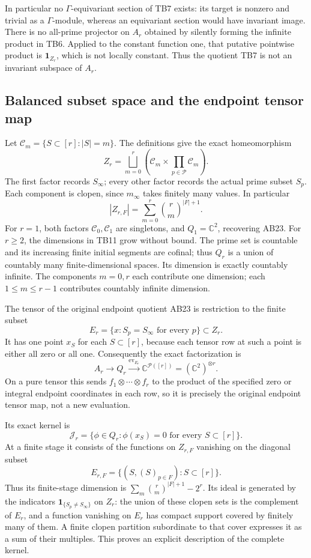 In particular no \(\Gamma\)-equivariant section of TB7 exists:
its target is nonzero and trivial as a \(\Gamma\)-module, whereas
an equivariant section would have invariant image.
There is no all-prime projector on \(A_r\) obtained by silently
forming the infinite product in TB6. Applied to the constant
function one, that putative pointwise product is
\(\mathbf1_{Z_r}\), which is not locally constant.
Thus the quotient TB7 is not an invariant subspace of \(A_r\).

\subsection{Balanced subset space and the endpoint tensor map}

Let \(\mathcal C_m=\{S\subset[r]:|S|=m\}\).
The definitions give the exact homeomorphism
\[
Z_r=
\bigsqcup_{m=0}^r
 \left(\mathcal C_m\times\prod_{p\in\mathcal P}\mathcal C_m\right).
\tag{TB10}
\]
The first factor records \(S_\infty\); every other factor records
the actual prime subset \(S_p\). Each component is clopen,
since \(m_\infty\) takes finitely many values.
In particular
\[
|Z_{r,F}|=\sum_{m=0}^r\binom rm^{|F|+1}.
\tag{TB11}
\]
For \(r=1\), both factors \(\mathcal C_0,\mathcal C_1\) are
singletons, and \(Q_1=\mathbb C^2\), recovering AB23.
For \(r\ge2\), the dimensions in TB11 grow without bound.
The prime set is countable and its increasing finite initial
segments are cofinal; thus \(Q_r\) is a union of countably many
finite-dimensional spaces. Its dimension is exactly countably
infinite. The components \(m=0,r\) each contribute one dimension;
each \(1\le m\le r-1\) contributes countably infinite dimension.

The tensor of the original endpoint quotient AB23 is restriction
to the finite subset
\[
E_r=\{x:S_p=S_\infty\text{ for every }p\}\subset Z_r.
\tag{TB12}
\]
It has one point \(x_S\) for each \(S\subset[r]\), because each
tensor row at such a point is either all zero or all one.
Consequently the exact factorization is
\[
A_r\longrightarrow Q_r
 \xrightarrow{\operatorname{ev}_{E_r}}\mathbb C^{\mathcal P([r])}
   =(\mathbb C^2)^{\otimes r}.
\tag{TB13}
\]
On a pure tensor this sends
\(f_1\otimes\cdots\otimes f_r\) to the product of the specified
zero or integral endpoint coordinates in each row, so it is
precisely the original endpoint tensor map, not a new evaluation.

Its exact kernel is
\[
\mathcal J_r=\{\phi\in Q_r:\phi(x_S)=0\text{ for every }S\subset[r]\}.
\tag{TB14}
\]
At a finite stage it consists of the functions on \(Z_{r,F}\)
vanishing on the diagonal subset
\[
E_{r,F}=\{(S,(S)_{p\in F}):S\subset[r]\}.
\]
Thus its finite-stage dimension is
\(\sum_m\binom rm^{|F|+1}-2^r\).
Its ideal is generated by the indicators
\(\mathbf1_{\{S_p\ne S_\infty\}}\) on \(Z_r\):
the union of these clopen sets is the complement of \(E_r\),
and a function vanishing on \(E_r\) has compact support covered
by finitely many of them. A finite clopen partition subordinate
to that cover expresses it as a sum of their multiples.
This proves an explicit description of the complete kernel.

